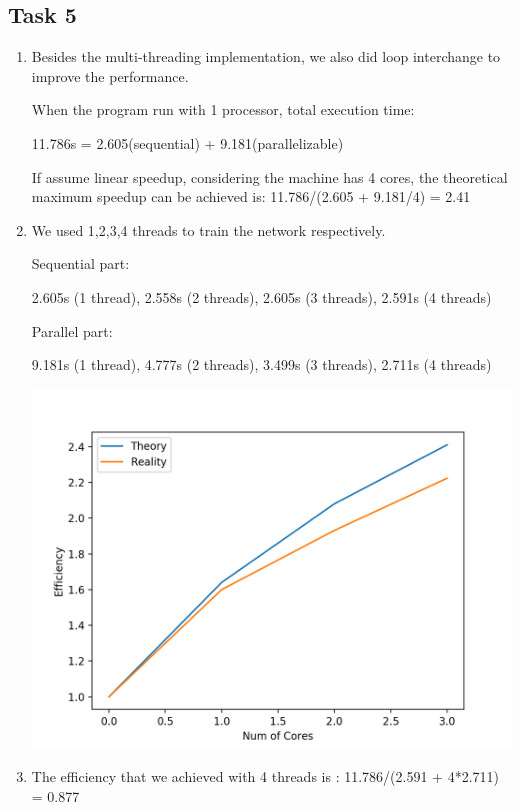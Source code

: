 \documentclass[a4paper, DIV12, headsepline]{scrartcl}
\begin{document}
\subsection*{Task 5}
\begin{enumerate}[label=\alph*)]
\item Besides the multi-threading implementation, we also did loop interchange to improve the performance. 

When the program run with 1 processor, total execution time: 

11.786s = 2.605(sequential) + 9.181(parallelizable)

If assume linear speedup, considering the machine has 4 cores, the theoretical  maximum speedup can be achieved is: 11.786/(2.605 + 9.181/4) = 2.41

\item We used 1,2,3,4 threads to train the network respectively. 

Sequential part: 

	    2.605s (1 thread), 2.558s (2 threads), 2.605s (3 threads), 2.591s (4 threads)

Parallel part: 

	    9.181s (1 thread), 4.777s (2 threads), 3.499s (3 threads), 2.711s (4 threads)

\begin{center}
	\includegraphics[scale=0.5]{task-5-plot}
\end{center}

%

\item The efficiency that we achieved with 4 threads is : 11.786/(2.591 + 4*2.711) = 0.877
%
%
%
\end{enumerate}
\end{document}
